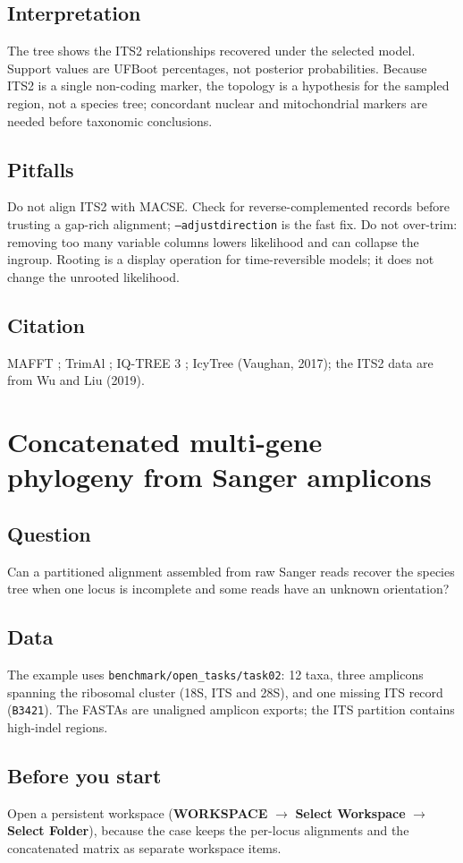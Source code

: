 \documentclass[11pt]{report}
\begin{document}
\section{Interpretation}
The tree shows the ITS2 relationships recovered under the selected model.
Support values are UFBoot percentages, not posterior probabilities. Because
ITS2 is a single non-coding marker, the topology is a hypothesis for the
sampled region, not a species tree; concordant nuclear and mitochondrial
markers are needed before taxonomic conclusions.

\section{Pitfalls}
Do not align ITS2 with MACSE. Check for reverse-complemented records before
trusting a gap-rich alignment; \texttt{--adjustdirection} is the fast fix.
Do not over-trim: removing too many variable columns lowers likelihood and
can collapse the ingroup. Rooting is a display operation for time-reversible
models; it does not change the unrooted likelihood.

\section{Citation}
MAFFT \cite{mafft}; TrimAl \cite{trimal}; IQ-TREE 3 \cite{iqtree3};
IcyTree (Vaughan, 2017); the ITS2 data are from Wu and Liu (2019).

\chapter{Concatenated multi-gene phylogeny from Sanger amplicons}
\section{Question}
Can a partitioned alignment assembled from raw Sanger reads recover the
species tree when one locus is incomplete and some reads have an unknown
orientation?

\section{Data}
The example uses \texttt{benchmark/open\_tasks/task02}: 12 taxa, three
amplicons spanning the ribosomal cluster (18S, ITS and 28S), and one missing
ITS record (\texttt{B3421}). The FASTAs are unaligned amplicon exports; the
ITS partition contains high-indel regions.

\section{Before you start}
Open a persistent workspace (\textbf{WORKSPACE} $\rightarrow$ \textbf{Select
Workspace} $\rightarrow$ \textbf{Select Folder}), because the case keeps the
per-locus alignments and the concatenated matrix as separate workspace items.
\end{document}
